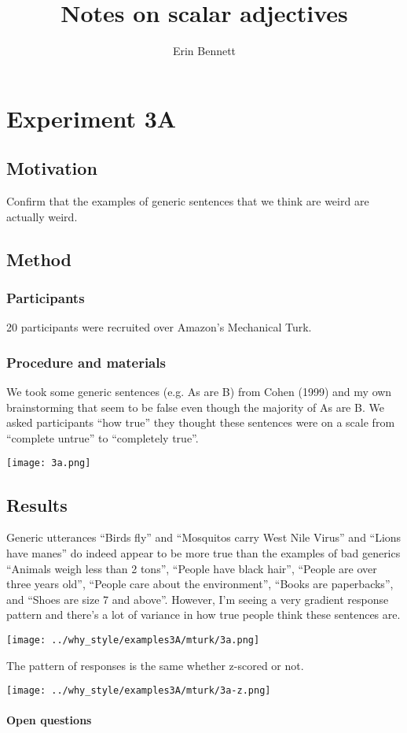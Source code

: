 \documentclass[a4paper,10pt]{article}
\author{Erin Bennett}
\title{Notes on scalar adjectives}
\begin{document}
 
\tableofcontents

\section{Experiment 3A}
  \subsection{Motivation}
    Confirm that the examples of generic sentences that we think are weird are actually weird.
  \subsection{Method}
    \subsubsection{Participants} 20 participants were recruited over Amazon’s Mechanical Turk.
    \subsubsection{Procedure and materials} We took some generic sentences (e.g. As are B) from Cohen (1999) and my own brainstorming that seem to be false even though the majority of As are B. We asked participants ``how true'' they thought these sentences were on a scale from ``complete untrue'' to ``completely true''.

    \begin{center}
      \texttt{[image: 3a.png]}
    \end{center}

  \subsection{Results}
    Generic utterances ``Birds fly'' and ``Mosquitos carry West Nile Virus'' and ``Lions have manes'' do indeed appear to be more true than the examples of bad generics ``Animals weigh less than 2 tons'', ``People have black hair'', ``People are over three years old'', ``People care about the environment'', ``Books are paperbacks'', and ``Shoes are size 7 and above''. However, I'm seeing a very gradient response pattern and there's a lot of variance in how true people think these sentences are.

    \begin{center}
      \texttt{[image: ../why\_style/examples3A/mturk/3a.png]}
    \end{center}
    
    The pattern of responses is the same whether z-scored or not.

    \begin{center}
      \texttt{[image: ../why\_style/examples3A/mturk/3a-z.png]}
    \end{center}
    
    \paragraph{Open questions}
\end{document}
